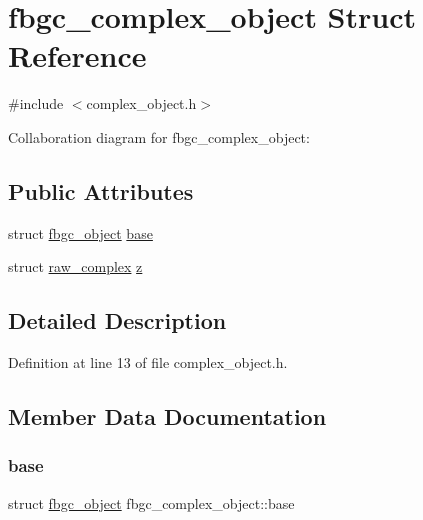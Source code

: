 \hypertarget{structfbgc__complex__object}{}\section{fbgc\+\_\+complex\+\_\+object Struct Reference}
\label{structfbgc__complex__object}


{\ttfamily \#include $<$complex\+\_\+object.\+h$>$}



Collaboration diagram for fbgc\+\_\+complex\+\_\+object\+:
\subsection*{Public Attributes}
\begin{DoxyCompactItemize}
\item 
struct \hyperlink{structfbgc__object}{fbgc\+\_\+object} \hyperlink{structfbgc__complex__object_ad2165055d78edca83d1b6dbd493afe71}{base}
\item 
struct \hyperlink{structraw__complex}{raw\+\_\+complex} \hyperlink{structfbgc__complex__object_a218f991fda9b8e5e9a9f97db4e588793}{z}
\end{DoxyCompactItemize}


\subsection{Detailed Description}


Definition at line 13 of file complex\+\_\+object.\+h.



\subsection{Member Data Documentation}
\mbox{\label{structfbgc__complex__object_ad2165055d78edca83d1b6dbd493afe71}} 
\subsubsection{\texorpdfstring{base}{base}}
{\footnotesize\ttfamily struct \hyperlink{structfbgc__object}{fbgc\+\_\+object} fbgc\+\_\+complex\+\_\+object\+::base}



